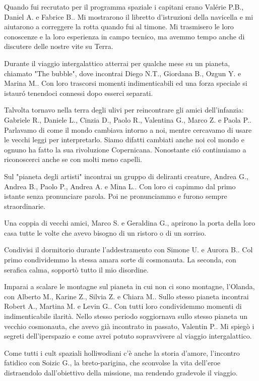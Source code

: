 Quando fui recrutato per il programma spaziale i capitani erano Val\'erie P.B., Daniel A. e Fabrice B.. Mi mostrarono il libretto d'istruzioni della navicella e mi aiutarono a correggere la rotta quando fui al timone. Mi trasmisero le loro conoscenze e la loro esperienza in campo tecnico, ma avemmo tempo anche di discutere delle nostre vite su Terra. 

Durante il viaggio intergalattico atterrai per qualche mese su un pianeta, chiamato "The bubble", dove incontrai Diego N.T., Giordana B., Ozgun Y. e Marina M.. Con loro trascorsi momenti indimenticabili ed una forza speciale si istaur\'o tenendoci connessi dopo esserci separati. 

Talvolta tornavo nella terra degli ulivi per reincontrare gli amici dell'infanzia: Gabriele R., Daniele L., Cinzia D., Paolo R., Valentina G., Marco Z. e Paola P.. Parlavamo di come il mondo cambiava intorno a noi, mentre cercavamo di usare le vecchi leggi per interpretarlo. Siamo difatti cambiati anche noi col mondo e ognuno ha fatto la sua rivoluzione Copernicana. Nonostante ci\'o continuiamo a riconoscerci anche se con molti meno capelli.  

Sul "pianeta degli artisti" incontrai un gruppo di deliranti creature, Andrea G., Andrea B., Paolo P., Andrea A. e Mina L.. Con loro ci capimmo dal primo istante senza pronunciare parola. Poi ne pronunciammo e furono sempre straordinarie.

Una coppia di vecchi amici, Marco S. e Geraldina G., aprirono la porta della loro casa tutte le volte che avevo bisogno di un ristoro o di un sorriso.

Condivisi il dormitorio durante l'addestramento con Simone U. e Aurora B.. Col primo condividemmo la stessa amara sorte di cosmonauta. La seconda, con serafica calma, sopport\`o tutto il mio disordine.

Imparai a scalare le montagne sul pianeta in cui non ci sono montagne, l'Olanda, con Alberto M., Karine Z., Silvia Z. e Chiara M.. Sullo stesso pianeta incontrai Robert A., Martina M. e Levin G.. Con tutti loro condividemmo momenti di indimenticabile ilarit\`a. Nello stesso periodo soggiornava sullo stesso pianeta un vecchio cosmonauta, che avevo gi\`a incontrato in passato, Valentin P.. Mi spieg\`o i segreti dell'iperspazio e come avrei potuto sopravvivere al viaggio intergalattico.  

Come tutti i cult spaziali holliwodiani c'\`e anche la storia d'amore, l'incontro fatidico con Soizic G., la breto-parigina, che sconvolse la vita dell'eroe distraendolo dall'obiettivo della missione, ma rendendo gradevole il viaggio. 
